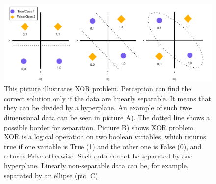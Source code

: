\begin{figure}[H]
\centering
\includegraphics[width=1\columnwidth]{../img/xor}
\caption{This picture illustrates XOR problem. Perception can find the correct solution only if the data are linearly separable. It means that they can be divided by a hyperplane. An example of such two-dimensional data can be seen in picture A). The dotted line shows a possible border for separation. Picture B) shows XOR problem. XOR is a logical operation on two boolean variables, which returns true if one variable is True (1) and the other one is False (0), and returns False otherwise. Such data cannot be separated by one hyperplane. Linearly non-separable data can be, for example, separated by an ellipse (pic. C).}
\label{pic:xor}
\end{figure}

